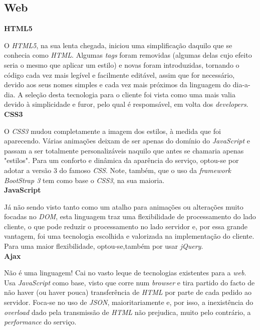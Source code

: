 \subsection{Web} 

	\textbf{\large{HTML5}}\\
	\label{ssub:html5}
	
	O \emph{HTML5}, na sua lenta chegada, iniciou uma simplificação daquilo que se conhecia como \emph{HTML}. Algumas \emph{tags} foram removidas (algumas delas cujo efeito seria o mesmo que aplicar um estilo) e novas foram introduzidas, tornando o código cada vez mais legível e facilmente editável, assim que for necessário, devido aos seus nomes simples e cada vez mais próximos da linguagem do dia-a-dia. A seleção desta tecnologia para o cliente foi vista como uma mais valia devido à simplicidade e furor, pelo qual é respomsável, em volta dos \emph{developers}.\\

	\textbf{\large{CSS3}}\\
	\label{ssub:css3}
	
	O \emph{CSS3} mudou completamente a imagem dos estilos, à medida que foi aparecendo. Várias animações deixam de ser apenas do domínio do \emph{JavaScript} e passam a ser totalmente personalizáveis naquilo que antes se chamaria apenas "estilos". Para um conforto e dinâmica da aparência do serviço, optou-se por adotar a versão 3 do famoso \emph{CSS}. Note, também, que o uso da \emph{framework} \emph{BootStrap 3} tem como base o \emph{CSS3}, na sua maioria.\\

	\textbf{\large{JavaScript}}\\
	\label{ssub:javascript}
	
	Já não sendo visto tanto como um atalho para animações ou alterações muito focadas no \emph{DOM}, esta linguagem traz uma flexibilidade de processamento do lado cliente, o que pode reduzir o processamento no lado servidor e, por essa grande vantagem, foi uma tecnologia escolhida e valorizada na implementação do cliente. Para uma maior flexibilidade, optou-se,também por usar \textit{jQuery}.\\

	\textbf{\large{Ajax}}\\
	\label{ssub:ajax}
	
	Não é uma linguagem! Cai no vasto leque de tecnologias existentes para a \emph{web}. Usa \emph{JavaScript} como base, visto que corre num \emph{browser} e tira partido do facto de não haver (ou haver pouca) transferência de \emph{HTML} por parte de cada pedido ao servidor. Foca-se no uso de \emph{JSON}, maioritariamente e, por isso, a inexistência do \emph{overload} dado pela transmissão de \emph{HTML} não prejudica, muito pelo contrário, a \emph{performance} do serviço.\\